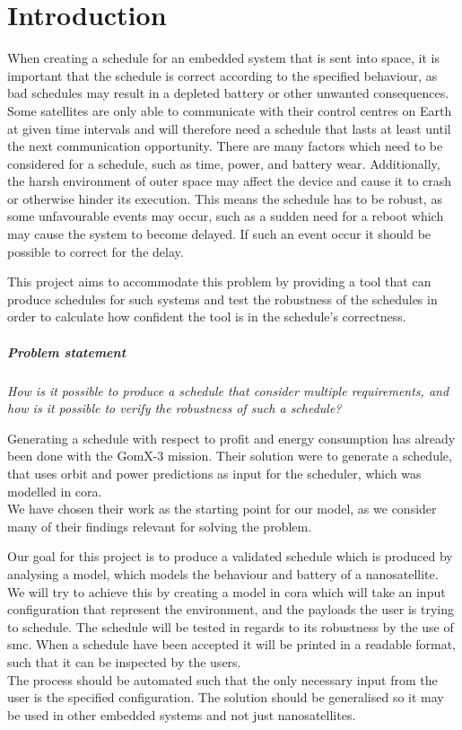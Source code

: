 \chapter{Introduction} \label{cha:intro}
When creating a schedule for an embedded system that is sent into space, it is important that the schedule is correct according to the specified behaviour, as bad schedules may result in a depleted battery or other unwanted consequences. 
Some satellites are only able to communicate with their control centres on Earth at given time intervals and will therefore need a schedule that lasts at least until the next communication opportunity.
There are many factors which need to be considered for a schedule, such as time, power, and battery wear. 
Additionally, the harsh environment of outer space may affect the device and cause it to crash or otherwise hinder its execution.
This means the schedule has to be robust, as some unfavourable events may occur, such as a sudden need for a reboot which may cause the system to become delayed. 
If such an event occur it should be possible to correct for the delay.

This project aims to accommodate this problem by providing a tool that can produce schedules for such systems and test the robustness of the schedules in order to calculate how confident the tool is in the schedule's correctness.

\paragraph{Problem statement}
\textit{How is it possible to produce a schedule that consider multiple requirements, and how is it possible to verify the robustness of such a schedule?}

Generating a schedule with respect to profit and energy consumption has already been done with the GomX-3 mission\cite{gomx3}.
Their solution were to generate a schedule, that uses orbit and power predictions as input for the scheduler, which was modelled in \gls{cora}.\\
We have chosen their work as the starting point for our model, as we consider many of their findings relevant for solving the problem.

Our goal for this project is to produce a validated schedule which is produced by analysing a model, which models the behaviour and battery of a nanosatellite.\\
We will try to achieve this by creating a model in \gls{cora} which will take an input configuration that represent the environment, and the payloads the user is trying to schedule.
The schedule will be tested in regards to its robustness by the use of \gls{smc}. %
When a schedule have been accepted it will be printed in a readable format, such that it can be inspected by the users.\\
The process should be automated such that the only necessary input from the user is the specified configuration.
The solution should be generalised so it may be used in other embedded systems and not just nanosatellites.
